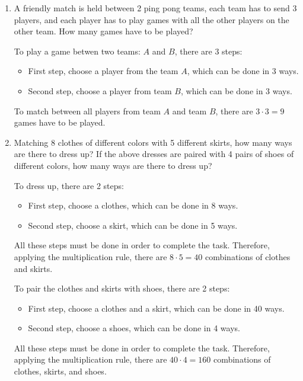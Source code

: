 \documentclass{report}
\begin{document}
\begin{multicols}{2}
\begin{enumerate}
    \item A friendly match is held between 2 ping pong teams, each team has to send 3
          players, and each player has to play games with all the other players on the
          other team. How many games have to be played? \sol{}

          To play a game betwen two teams: $A$ and $B$, there are 3 steps:
          \begin{itemize}
            \item First step, choose a player from the team $A$, which can be done in 3 ways.
            \item Second step, choose a player from team $B$, which can be done in 3 ways.
          \end{itemize}
          To match between all players from team $A$ and team $B$, there are $3 \cdot 3 = 9$ games have to be played.

    \item Matching 8 clothes of different colors with 5 different skirts, how many ways
          are there to dress up? If the above dresses are paired with 4 pairs of shoes of
          different colors, how many ways are there to dress up? \sol{}

          To dress up, there are 2 steps:
          \begin{itemize}
            \item First step, choose a clothes, which can be done in 8 ways.
            \item Second step, choose a skirt, which can be done in 5 ways.
          \end{itemize}
          All these steps must be done in order to complete the task. Therefore, applying the multiplication rule, there are $8 \cdot 5 = 40$ combinations of clothes and skirts.

          To pair the clothes and skirts with shoes, there are 2 steps:
          \begin{itemize}
            \item First step, choose a clothes and a skirt, which can be done in 40 ways.
            \item Second step, choose a shoes, which can be done in 4 ways.
          \end{itemize}
          All these steps must be done in order to complete the task. Therefore, applying the multiplication rule, there are $40 \cdot 4 = 160$ combinations of clothes, skirts, and shoes.

  \end{enumerate}


\end{multicols}
\end{document}
